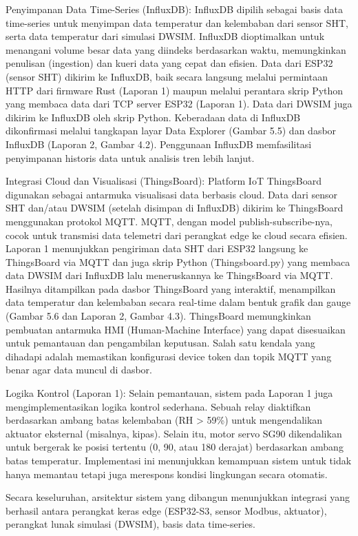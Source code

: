 \documentclass[a4paper, 12pt]{article}
\begin{document}
Penyimpanan Data Time-Series (InfluxDB): InfluxDB dipilih sebagai basis data time-series untuk menyimpan data temperatur dan kelembaban dari sensor SHT, serta data temperatur dari simulasi DWSIM. InfluxDB dioptimalkan untuk menangani volume besar data yang diindeks berdasarkan waktu, memungkinkan penulisan (ingestion) dan kueri data yang cepat dan efisien. Data dari ESP32 (sensor SHT) dikirim ke InfluxDB, baik secara langsung melalui permintaan HTTP dari firmware Rust (Laporan 1) maupun melalui perantara skrip Python yang membaca data dari TCP server ESP32 (Laporan 1). Data dari DWSIM juga dikirim ke InfluxDB oleh skrip Python. Keberadaan data di InfluxDB dikonfirmasi melalui tangkapan layar Data Explorer (Gambar 5.5) dan dasbor InfluxDB (Laporan 2, Gambar 4.2). Penggunaan InfluxDB memfasilitasi penyimpanan historis data untuk analisis tren lebih lanjut.

Integrasi Cloud dan Visualisasi (ThingsBoard): Platform IoT ThingsBoard digunakan sebagai antarmuka visualisasi data berbasis cloud. Data dari sensor SHT dan/atau DWSIM (setelah disimpan di InfluxDB) dikirim ke ThingsBoard menggunakan protokol MQTT. MQTT, dengan model publish-subscribe-nya, cocok untuk transmisi data telemetri dari perangkat edge ke cloud secara efisien. Laporan 1 menunjukkan pengiriman data SHT dari ESP32 langsung ke ThingsBoard via MQTT dan juga skrip Python (Thingsboard.py) yang membaca data DWSIM dari InfluxDB lalu meneruskannya ke ThingsBoard via MQTT. Hasilnya ditampilkan pada dasbor ThingsBoard yang interaktif, menampilkan data temperatur dan kelembaban secara real-time dalam bentuk grafik dan gauge (Gambar 5.6 dan Laporan 2, Gambar 4.3). ThingsBoard memungkinkan pembuatan antarmuka HMI (Human-Machine Interface) yang dapat disesuaikan untuk pemantauan dan pengambilan keputusan. Salah satu kendala yang dihadapi adalah memastikan konfigurasi device token dan topik MQTT yang benar agar data muncul di dasbor.

Logika Kontrol (Laporan 1): Selain pemantauan, sistem pada Laporan 1 juga mengimplementasikan logika kontrol sederhana. Sebuah relay diaktifkan berdasarkan ambang batas kelembaban (RH > 59\%) untuk mengendalikan aktuator eksternal (misalnya, kipas). Selain itu, motor servo SG90 dikendalikan untuk bergerak ke posisi tertentu (0, 90, atau 180 derajat) berdasarkan ambang batas temperatur. Implementasi ini menunjukkan kemampuan sistem untuk tidak hanya memantau tetapi juga merespons kondisi lingkungan secara otomatis.

Secara keseluruhan, arsitektur sistem yang dibangun menunjukkan integrasi yang berhasil antara perangkat keras edge (ESP32-S3, sensor Modbus, aktuator), perangkat lunak simulasi (DWSIM), basis data time-series.
\newpage
\end{document}
